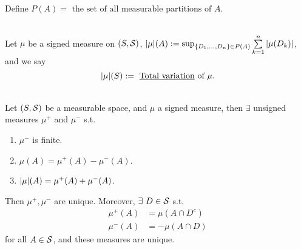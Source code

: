 \begin{definition}\ \\
Define $P(A) = \text{ the set of all measurable partitions of }A$.
\end{definition}

\begin{definition}\ \\
Let $\mu$ be a signed measure on $(S,\mathcal{S})$, $\abs{\mu}(A) := \sup_{\{D_1,\dots,D_n\} \in P(A)} \sum\limits_{k=1}^n \abs{\mu(D_k)}$, and we say $$\abs{\mu}(S) := \text{ \underline{Total variation} of } \mu.$$
\end{definition}

\begin{theorem}\label{HJ decomposition}\ \\
Let $(S,\mathcal{S})$ be a measurable space, and $\mu$ a signed measure, then $\exists$ unsigned measures $\mu^+$ and $\mu^-$ s.t.
\begin{enumerate}[label = (\alph*)]
    \item $\mu^-$ is finite.
    \item $\mu(A) = \mu^+(A) - \mu^-(A)$.
    \item $\abs{\mu}(A) = \mu^+(A) + \mu^-(A)$.
\end{enumerate}
Then $\mu^+,\mu^-$ are unique. Moreover, $\exists\ D \in \mathcal{S}$ s.t. 
\begin{align*}
    \mu^+ (A) &= \mu(A \cap D^c)\\
    \mu^-(A) &= - \mu(A \cap D)
\end{align*} 
for all $A \in \mathcal{S}$, and these measures are unique.
\end{theorem}
